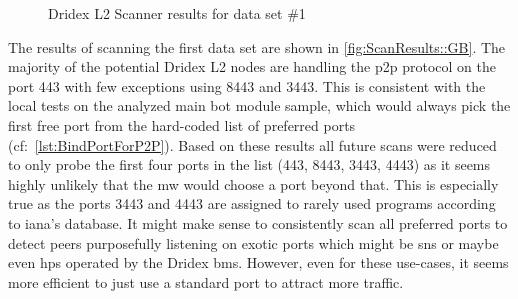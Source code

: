 \begin{figure}
    \centering
    \caption{Dridex L2 Scanner results for data set \#1\label{fig:ScanResults::GB}}
\end{figure}

The results of scanning the first data set are shown in \autoref{fig:ScanResults::GB}.
The majority of the potential Dridex L2 nodes are handling the \gls{p2p} protocol on the port 443 with few exceptions using 8443 and 3443.
This is consistent with the local tests on the analyzed main bot module sample, which would always pick the first free port from the hard-coded list of preferred ports (cf:~\autoref{lst:BindPortForP2P}).
Based on these results all future scans were reduced to only probe the first four ports in the list (443, 8443, 3443, 4443) as it seems highly unlikely that the \gls{mw} would choose a port beyond that.
This is especially true as the ports 3443 and 4443 are assigned to rarely used programs according to \gls{iana}'s database.
It might make sense to consistently scan all preferred ports to detect peers purposefully listening on exotic ports which might be \glspl{sn} or maybe even \glspl{hp} operated by the Dridex \glspl{bm}.
However, even for these use-cases, it seems more efficient to just use a standard port to attract more traffic.

